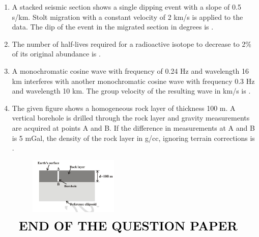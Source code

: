\documentclass[journal,12pt,onecolumn]{IEEEtran}
\begin{document}
\begin{enumerate}
\hfill{}

\item A stacked seismic section shows a single dipping event with a slope of 0.5 s/km. Stolt migration with a constant velocity of 2 km/s is applied to the data. The dip of the event in the migrated section in degrees is  .  

\hfill{}

\item The number of half-lives  required for a radioactive isotope to decrease to 2\% of its original abundance is  .  

\hfill{}

\item A monochromatic cosine wave with frequency of 0.24 Hz and wavelength 16 km interferes with another monochromatic cosine wave with frequency 0.3 Hz and wavelength 10 km. The group velocity of the resulting wave in km/s is .  

\hfill{}

\newpage

\item The given figure shows a homogeneous rock layer of thickness 100 m. A vertical borehole is drilled through the rock layer and gravity measurements are acquired at points A and B. If the difference in measurements at A and B is 5 mGal, the density of the rock layer \brak{\text{$\rho$}} in g/cc, ignoring terrain corrections is .  

\begin{figure}[h!]
    \centering
    \includegraphics[width=0.4\textwidth]{figs/fig11.png}
    \caption{}
    \label{fig:q18}
\end{figure}


\hfill{}





\end{enumerate}


\begin{align*}
 {\LARGE{\textbf{END OF THE QUESTION PAPER}}}
\end{align*}
\end{document}
